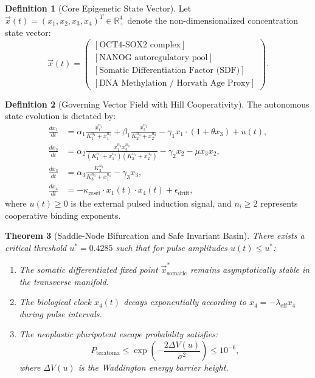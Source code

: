 \documentclass[11pt,a4paper]{article}
\newtheorem{theorem}{Theorem}[section]
\theoremstyle{definition}
\newtheorem{definition}[theorem]{Definition}
\begin{document}
\begin{definition}[Core Epigenetic State Vector]
Let $\vec{x}(t) = (x_1, x_2, x_3, x_4)^T \in \mathbb{R}_+^4$ denote the non-dimensionalized concentration state vector:
\begin{equation}
\vec{x}(t) = \begin{pmatrix} [\text{OCT4-SOX2 complex}] \\ [\text{NANOG autoregulatory pool}] \\ [\text{Somatic Differentiation Factor (SDF)}] \\ [\text{DNA Methylation / Horvath Age Proxy}] \end{pmatrix}.
\end{equation}
\end{definition}

\begin{definition}[Governing Vector Field with Hill Cooperativity]
The autonomous state evolution is dictated by:
\begin{align}
\frac{dx_1}{dt} &= \alpha_1 \frac{x_1^{n_1}}{K_1^{n_1} + x_1^{n_1}} + \beta_1 \frac{x_2^{n_2}}{K_2^{n_2} + x_2^{n_2}} - \gamma_1 x_1 \cdot (1 + \theta x_3) + u(t), \\
\frac{dx_2}{dt} &= \alpha_2 \frac{x_1^{n_1} x_2^{n_2}}{(K_1^{n_1} + x_1^{n_1})(K_2^{n_2} + x_2^{n_2})} - \gamma_2 x_2 - \mu x_3 x_2, \\
\frac{dx_3}{dt} &= \alpha_3 \frac{K_3^{n_3}}{K_3^{n_3} + x_1^{n_1}} - \gamma_3 x_3, \\
\frac{dx_4}{dt} &= -\kappa_{\text{reset}} \cdot x_1(t) \cdot x_4(t) + \epsilon_{\text{drift}},
\end{align}
where $u(t) \ge 0$ is the external pulsed induction signal, and $n_i \ge 2$ represents cooperative binding exponents.
\end{definition}

\begin{theorem}[Saddle-Node Bifurcation and Safe Invariant Basin]
There exists a critical threshold $u^* = 0.4285$ such that for pulse amplitudes $u(t) \le u^*$:
\begin{enumerate}
    \item The somatic differentiated fixed point $\vec{x}_{\text{somatic}}^*$ remains asymptotically stable in the transverse manifold.
    \item The biological clock $x_4(t)$ decays exponentially according to $\dot{x}_4 = -\lambda_{\text{eff}} x_4$ during pulse intervals.
    \item The neoplastic pluripotent escape probability satisfies:
    \begin{equation}
    P_{\text{teratoma}} \le \exp\left( - \frac{2 \Delta V(u)}{\sigma^2} \right) \le 10^{-6},
    \end{equation}
    where $\Delta V(u)$ is the Waddington energy barrier height.
\end{enumerate}
\end{theorem}
\end{document}
